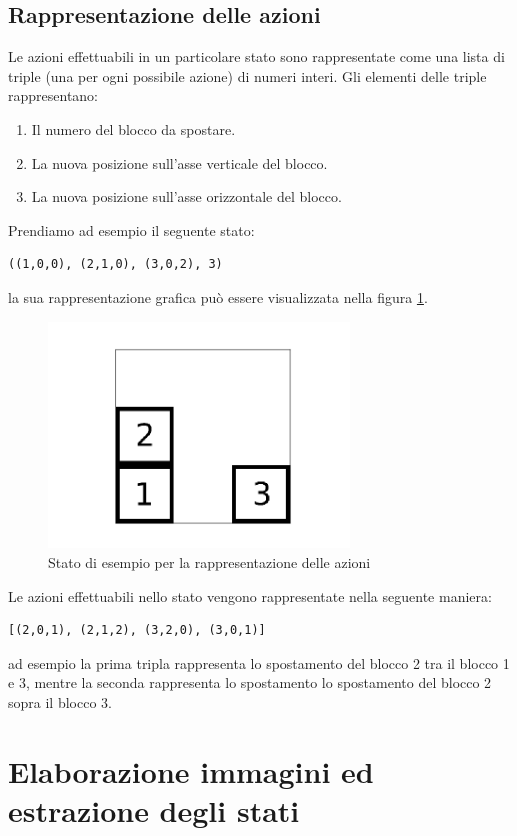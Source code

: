 \documentclass{article}
\begin{document}
	\subsection{Rappresentazione delle azioni}
	Le azioni effettuabili in un particolare stato sono rappresentate come una lista di triple (una per ogni possibile azione) di numeri interi. Gli elementi delle triple rappresentano:
	\begin{enumerate}
		\item Il numero del blocco da spostare.
		\item La nuova posizione sull'asse verticale del blocco.
		\item La nuova posizione sull'asse orizzontale del blocco.
	\end{enumerate}
	Prendiamo ad esempio il seguente stato:
	\begin{verbatim}
((1,0,0), (2,1,0), (3,0,2), 3)
	\end{verbatim}
	la sua rappresentazione grafica può essere visualizzata nella figura \ref{fig:actions}.
	\begin{figure}[H]
		\centering
		\includegraphics[width=8cm]{./images/action_example.png}
		\caption{Stato di esempio per la rappresentazione delle azioni}
		\label{fig:actions}
	\end{figure}
	\noindent Le azioni effettuabili nello stato vengono rappresentate nella seguente maniera:
	\begin{verbatim}
[(2,0,1), (2,1,2), (3,2,0), (3,0,1)]
	\end{verbatim}
	ad esempio la prima tripla rappresenta lo spostamento del blocco 2 tra il blocco 1 e 3, mentre la seconda rappresenta lo spostamento lo spostamento del blocco 2 sopra il blocco 3.
	\section{Elaborazione immagini ed estrazione degli stati}
\end{document}

